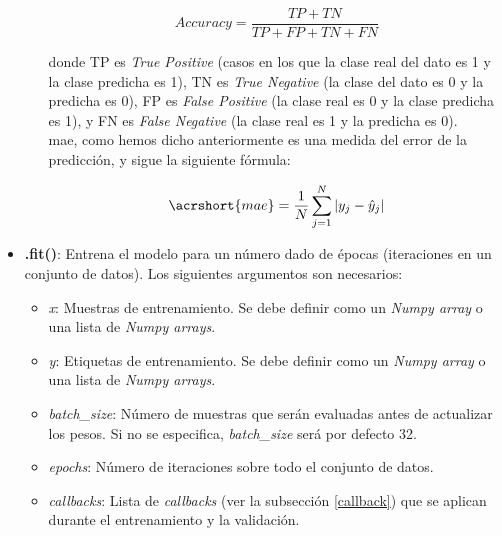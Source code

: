 \begin{itemize}
\begin{itemize}
            \begin{equation}\label{eq:accuracy}
                \textit{Accuracy} = \frac{TP + TN}{TP + FP + TN + FN}
            \end{equation}
            
            donde TP es \textit{True Positive} (casos en los que la clase real del dato es 1 y la clase predicha es 1), TN es \textit{True Negative} (la clase del dato es 0 y la predicha es 0), FP es \textit{False Positive} (la clase real es 0 y la clase predicha es 1), y FN es \textit{False Negative} (la clase real es 1 y la predicha es 0).\\
            
            \acrfull{mae}, como hemos dicho anteriormente es una medida del error de la predicción, y sigue la siguiente fórmula:
            
            \begin{equation}\label{eq:mae}
                \acrshort{mae} = \frac{1}{N}\sum_{j=1}^{N}|y_j - \hat{y}_j|
            \end{equation}
        \end{itemize}
    
    \item \textbf{.fit()}: Entrena el modelo para un número dado de épocas (iteraciones en un conjunto de datos). Los siguientes argumentos son necesarios:
    
        \begin{itemize}
            \item \textit{x}: Muestras de entrenamiento. Se debe definir como un \textit{Numpy array} o una lista de \textit{Numpy arrays}.
            
            \item \textit{y}: Etiquetas de entrenamiento. Se debe definir como un \textit{Numpy array} o una lista de \textit{Numpy arrays}.
            
            \item \textit{batch\_size}: Número de muestras que serán evaluadas antes de actualizar los pesos. Si no se especifica, \textit{batch\_size} será por defecto 32.
            
            \item \textit{epochs}: Número de iteraciones sobre todo el conjunto de datos.
            
            \item \textit{callbacks}: Lista de \textit{callbacks} (ver la subsección \ref{callback}) que se aplican durante el entrenamiento y la validación.
            

\end{itemize}
\end{itemize}
